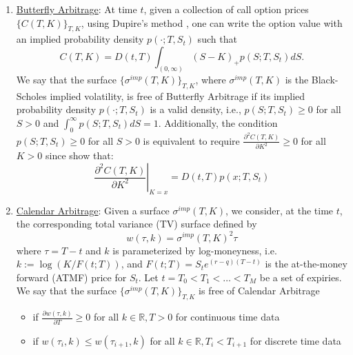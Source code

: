 \documentclass[letterpaper,12pt,titlepage,oneside,final]{book}
\numberwithin{equation}{section}
\theoremstyle{definition}
\begin{document}
\begin{enumerate}
\item  \label{item:butterfly}\underline{Butterfly Arbitrage}: At time $t$, given a collection of call option prices $\{C(T,K)\}_{T,K}$, using Dupire's method \cite{dupire1994pricing}, one can write the option value with  an implied probability density $ p(\cdot;T,S_t) $ such that 
\[
C(T,K) = D(t,T) \int_{(0,\infty)} (S - K)_+ p(S;T,S_t) dS.
\]
We say that the surface $\{ \sigma^{imp}(T,K) \}_{T,K}$, where $\sigma^{imp}(T,K)$ is the Black-Scholes implied volatility, is free of Butterfly Arbitrage if its implied probability density $p(\cdot ; T,S_t)$ is a valid density, i.e., $p(S;T,S_t) \geq 0$ for all $S > 0$ and $\int_{0}^{\infty} p(S;T,S_t) dS = 1$. 
Additionally, the condition $p(S;T,S_t) \geq 0$ for all $S > 0$ is equivalent to require $\frac{\partial^2 C(T,K)}{\partial K^2} \geq 0$ for all $K > 0$ since 
\citet{breeden1978prices} show that:
\[
	\left. \frac{\partial^2 C(T,K)}{\partial K^2} \right\vert_{K=x}=D(t,T)	p(x;T,S_t)
\]


\item \label{item:calendar} \underline{Calendar Arbitrage}:
 Given a surface $\sigma^{imp}(T,K)$, we consider, at the time $t$, the corresponding total variance (TV) surface defined by 
 \[
 w(\tau,k) = \sigma^{imp}(T,K)^2 \tau
 \]
 where $\tau =T-t$ and $k$ is parameterized by log-moneyness, i.e. $k := \log(K/F(t;T))$, and $F(t;T)=S_te^{(r-q)(T-t)}$ is the at-the-money forward (ATMF) price for $S_t$. Let $t=T_0 < T_1 < \dots< T_{M} $ be a set of expiries. We say that the surface $\{ \sigma^{imp}(T,K) \}_{T,K}$ is free of Calendar Arbitrage 
\begin{itemize}
\item if $\frac{\partial w(\tau,k)}{\partial T} \geq 0 $ for all $k \in \mathbb{R}, T > 0$ for continuous time data
\item if $w(\tau_i,k) \leq w(\tau_{i+1},k)$ for all $k \in \mathbb{R},  T_{i} < T_{i+1}$ for discrete time data 
\end{itemize}


\end{enumerate}
\end{document}
